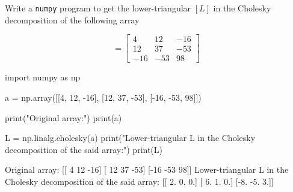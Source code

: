 \cprotEnv\begin{question}
Write a \texttt{numpy} program to get the lower-triangular $[L]$ in the Cholesky decomposition of the following array

\begin{equation*}
	[A] = \begin{bmatrix}
		4& 12 & -16\\
		12& 37 & -53\\
		-16& -53 & 98
	\end{bmatrix}
\end{equation*}
\end{question}

\cprotEnv\begin{solution}
\begin{ipython}
import numpy as np

a = np.array([[4, 12, -16], [12, 37, -53], [-16, -53, 98]])

print("Original array:")
print(a)

L = np.linalg.cholesky(a)
print("Lower-triangular L in the Cholesky decomposition of the said array:")
print(L)
\end{ipython}
\begin{ioutput}
Original array:
[[  4  12 -16]
 [ 12  37 -53]
 [-16 -53  98]]
Lower-triangular L in the Cholesky decomposition of the said array:
[[ 2.  0.  0.]
 [ 6.  1.  0.]
 [-8. -5.  3.]]
\end{ioutput}
\end{solution}

\cprotEnv\begin{question}

\end{question}
\cprotEnv\begin{solution}
\end{solution}